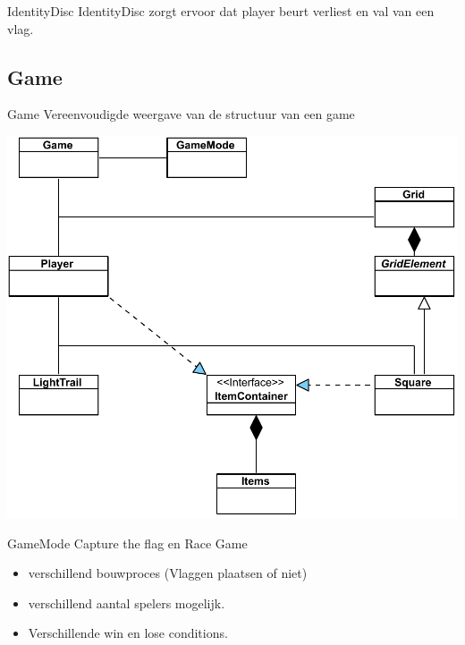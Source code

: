 \documentclass[11pt,t]{beamer}
\begin{document}
\begin{frame}{IdentityDisc}
IdentityDisc zorgt ervoor dat player beurt verliest en val van een vlag.
\begin{center}

\end{center}
\end{frame}

\subsection{Game}

\begin{frame}{Game}
Vereenvoudigde weergave van de structuur van een game
\begin{center}
\includegraphics[scale=0.5]{images/simple}
\end{center}
\end{frame}

\begin{frame}{GameMode}
Capture the flag en Race Game
\begin{itemize}
\item verschillend bouwproces (Vlaggen plaatsen of niet)
\item verschillend aantal spelers mogelijk.
\item Verschillende win en lose conditions.
\end{itemize}
\end{frame}
\end{document}
